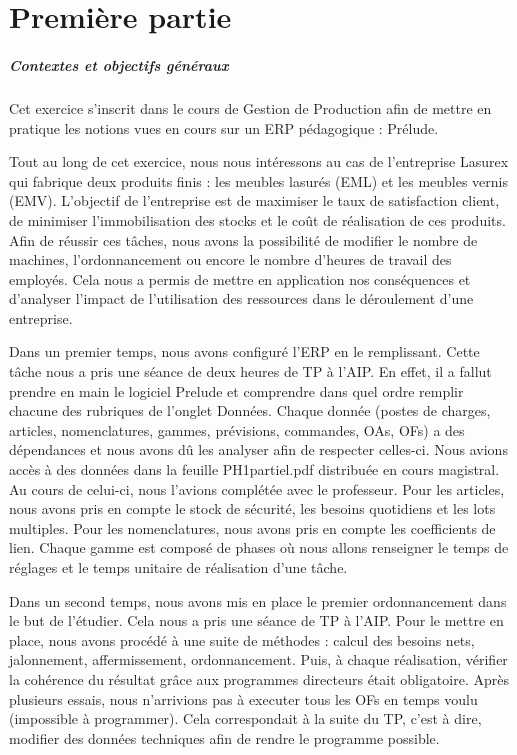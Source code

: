 \documentclass{scrreprt}
\begin{document}
\tableofcontents

\chapter{Première partie}

\paragraph{Contextes et objectifs généraux}
Cet exercice s'inscrit dans le cours de Gestion de Production afin de mettre en pratique les notions
vues en cours sur un ERP pédagogique :  Prélude. 

Tout au long de cet exercice, nous nous intéressons au cas de l'entreprise Lasurex qui fabrique deux
produits finis : les meubles lasurés (EML) et les meubles vernis (EMV). L'objectif de l'entreprise est 
de maximiser le taux de satisfaction client, de minimiser l'immobilisation des stocks et
le coût de réalisation de ces produits. Afin de réussir ces tâches, nous avons la possibilité de modifier le nombre de machines, l'ordonnancement ou encore le nombre d'heures de travail des employés. Cela nous a permis de mettre en application nos conséquences et d'analyser l'impact de l'utilisation des ressources dans le déroulement d'une entreprise.

Dans un premier temps, nous avons configuré l'ERP en le remplissant. Cette tâche nous a pris une séance de deux heures de TP à l'AIP. En effet, il a fallut prendre en main le logiciel Prelude et comprendre dans quel ordre remplir chacune des rubriques de l'onglet Données. Chaque donnée (postes de charges, articles, nomenclatures, gammes, prévisions, commandes, OAs, OFs) a des dépendances et nous avons dû les analyser afin de respecter celles-ci. Nous avions accès à des données dans la feuille PH1partiel.pdf distribuée en cours magistral. Au cours de celui-ci, nous l'avions complétée avec le professeur. Pour les articles, nous avons pris en compte le stock de sécurité, les besoins quotidiens et les lots multiples. Pour les nomenclatures, nous avons pris en compte les coefficients de lien. Chaque gamme est composé de phases où nous allons renseigner le temps de réglages et le temps unitaire de réalisation d'une tâche.

Dans un second temps, nous avons mis en place le premier ordonnancement dans le but de l'étudier. Cela nous a pris une séance de TP à l'AIP. Pour le mettre en place, nous avons procédé à une suite de méthodes : calcul des besoins nets, jalonnement, affermissement, ordonnancement. Puis, à chaque réalisation, vérifier la cohérence du résultat grâce aux programmes directeurs était obligatoire. Après plusieurs essais, nous n'arrivions pas à executer tous les OFs en temps voulu (impossible à programmer). Cela correspondait à la suite du TP, c'est à dire, modifier des données techniques afin de rendre le programme possible.
\end{document}
